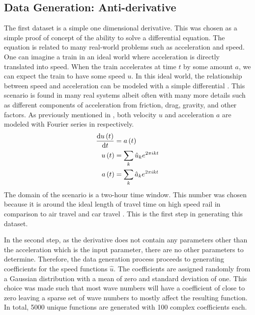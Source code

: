 \subsection{Data Generation: Anti-derivative}
\noindent The first dataset is a simple one dimensional derivative. This was chosen as a simple proof of concept of the ability to solve a differential equation. The equation is related to many real-world problems such as acceleration and speed. One can imagine a train in an ideal world where acceleration is directly translated into speed. When the train accelerates at time \(t \) by some amount \(a \), we can expect the train to have some speed \(u \). In this ideal world, the relationship between speed and acceleration can be modeled with a simple differential . This scenario is found in many real systems albeit often with many more details such as different components of acceleration from friction, drag, gravity, and other factors.
As previously mentioned in , both velocity \(u \) and acceleration \(a \) are modeled with Fourier series in  respectively.
\begin{align}
  \dv{u\left( t \right)}{t} & = a\left( t \right) \label{eq:derivative}                         \\
  u\left( t \right)         & = \sum_{k} \hat{u}_k e^{2\pi ikt} \label{eq:fourier_speed}        \\
  a\left( t \right)         & = \sum_{k} \hat{a}_k e^{2\pi ikt} \label{eq:fourier_acceleration}
\end{align}
The domain of the scenario is a two-hour time window. This number was chosen because it is around the ideal length of travel time on high speed rail in comparison to air travel and car travel \autocite{givoniDevelopmentImpactModern2006,wangEfficiencySpatialEquity2019,wrro2236}. This is the first step in generating this dataset.

In the second step, as the derivative  does not contain any parameters other than the acceleration which is the input parameter, there are no other parameters to determine. Therefore, the data generation process proceeds to generating coefficients for the speed functions \(\hat{u} \). The coefficients are assigned randomly from a Gaussian distribution with a mean of zero and standard deviation of one. This choice was made such that most wave numbers will have a coefficient of close to zero leaving a sparse set of wave numbers to mostly affect the resulting function. In total, 5000 unique functions are generated with 100 complex coefficients each.

